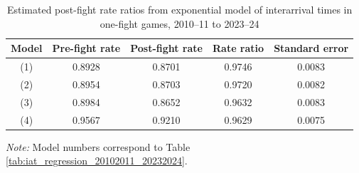 \begin{table}[!h]
\centering
\caption{Estimated post-fight rate ratios from exponential model of interarrival times in one-fight games, 2010--11 to 2023--24}
\label{tab:post_fight_rate_ratios_20102011_20232024}

\begin{tabular}{ccccc}
\toprule
Model & Pre-fight rate & Post-fight rate & Rate ratio & Standard error \\
\midrule
(1) & 0.8928 & 0.8701 & 0.9746 & 0.0083 \\
(2) & 0.8954 & 0.8703 & 0.9720 & 0.0082 \\
(3) & 0.8984 & 0.8652 & 0.9632 & 0.0083 \\
(4) & 0.9567 & 0.9210 & 0.9629 & 0.0075 \\
\bottomrule
\end{tabular}

\vspace{0.4em}
\parbox{0.95\textwidth}{
\footnotesize
\textit{Note:} Model numbers correspond to Table \ref{tab:iat_regression_20102011_20232024}.
}
\end{table}
